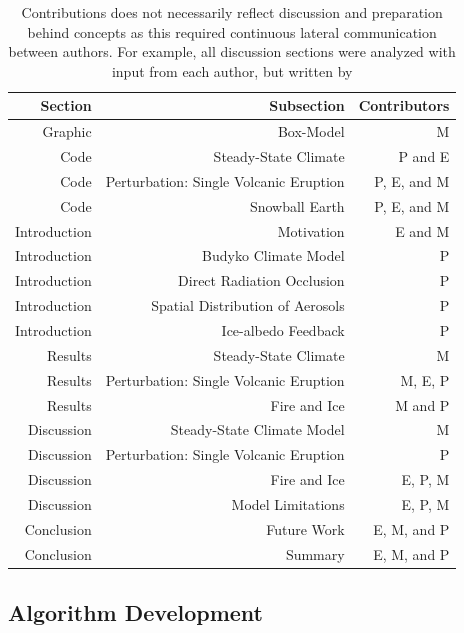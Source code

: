 \documentclass[12pt]{article}
\begin{document}
\begin{table}[H]
    \centering
    \begin{tabular}{rrr}
    Section & Subsection & Contributors \\
    \hline
    Graphic & Box-Model & M  \\
    Code & Steady-State Climate & P and E \\
    Code & Perturbation: Single Volcanic Eruption & P, E, and M \\
    Code & Snowball Earth & P, E, and M \\
    Introduction & Motivation & E and M \\
    Introduction & Budyko Climate Model & P \\
    Introduction & Direct Radiation Occlusion & P \\
    Introduction & Spatial Distribution of Aerosols & P \\
    Introduction & Ice-albedo Feedback & P \\ 
    Results & Steady-State Climate & M \\
    Results & Perturbation: Single Volcanic Eruption & M, E, P \\
    Results & Fire and Ice & M and P\\
    Discussion & Steady-State Climate Model & M \\
    Discussion & Perturbation: Single Volcanic Eruption & P \\
    Discussion & Fire and Ice & E, P, M\\
    Discussion & Model Limitations & E, P, M\\
    Conclusion & Future Work & E, M, and P \\
    Conclusion & Summary & E, M, and P \\
    \end{tabular}
    \caption{
        Contributions does not necessarily reflect discussion and preparation behind 
        concepts as this required continuous lateral communication between authors. 
        For example, all discussion sections were analyzed with
        input from each author, but written by
    }
    \label{tab:contributions}
\end{table}

\subsection{Algorithm Development} \label{sec:algorithm}
\end{document}
